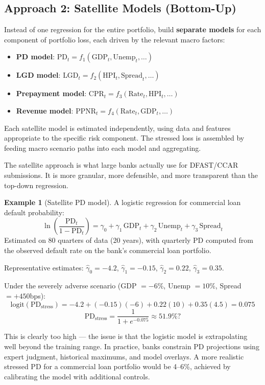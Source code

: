 \documentclass[11pt, a4paper]{article}
\theoremstyle{definition}
\newtheorem{example}{Example}[section]
\theoremstyle{plain}
\theoremstyle{remark}
\begin{document}
\subsection{Approach 2: Satellite Models (Bottom-Up)}

\begin{keyidea}
Instead of one regression for the entire portfolio,
build \textbf{separate models} for each component of portfolio loss,
each driven by the relevant macro factors:
\begin{itemize}
    \item \textbf{PD model}: $\text{PD}_t = f_1(\text{GDP}_t, \text{Unemp}_t, \ldots)$
    \item \textbf{LGD model}: $\text{LGD}_t = f_2(\text{HPI}_t, \text{Spread}_t, \ldots)$
    \item \textbf{Prepayment model}: $\text{CPR}_t = f_3(\text{Rate}_t, \text{HPI}_t, \ldots)$
    \item \textbf{Revenue model}: $\text{PPNR}_t = f_4(\text{Rate}_t, \text{GDP}_t, \ldots)$
\end{itemize}
Each satellite model is estimated independently, using data and features
appropriate to the specific risk component.
The stressed loss is assembled by feeding macro scenario paths into each model
and aggregating.
\end{keyidea}

The satellite approach is what large banks actually use for DFAST/CCAR submissions.
It is more granular, more defensible, and more transparent than the top-down regression.

\begin{example}[Satellite PD model]\label{ex:satellite-pd}
A logistic regression for commercial loan default probability:
\[
    \ln\!\left(\frac{\text{PD}_t}{1 - \text{PD}_t}\right)
    = \gamma_0 + \gamma_1 \,\text{GDP}_t + \gamma_2 \,\text{Unemp}_t + \gamma_3 \,\text{Spread}_t
\]
Estimated on 80 quarters of data (20 years), with quarterly PD computed
from the observed default rate on the bank's commercial loan portfolio.

Representative estimates: $\hat\gamma_0 = -4.2$, $\hat\gamma_1 = -0.15$,
$\hat\gamma_2 = 0.22$, $\hat\gamma_3 = 0.35$.

Under the severely adverse scenario (GDP $= -6\%$, Unemp $= 10\%$, Spread $= +450$bps):
\[
    \text{logit}(\text{PD}_{\text{stress}}) = -4.2 + (-0.15)(-6) + 0.22(10) + 0.35(4.5) = 0.075
\]
\[
    \text{PD}_{\text{stress}} = \frac{1}{1 + e^{-0.075}} \approx 51.9\%?
\]

This is clearly too high --- the issue is that the logistic model is extrapolating
well beyond the training range.
In practice, banks constrain PD projections using expert judgment,
historical maximums, and model overlays.
A more realistic stressed PD for a commercial loan portfolio would be 4--6\%,
achieved by calibrating the model with additional controls.
\end{example}
\end{document}
